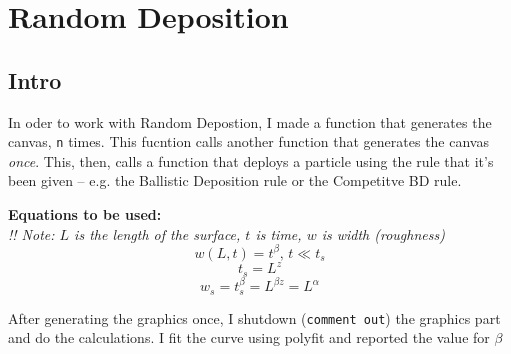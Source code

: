 \documentclass[12pt]{article}
\begin{document}
	\section{Random Deposition}
	\subsection{Intro}
	In oder to work with Random Depostion, I made a function that generates the canvas,
	\texttt{n} times. This fucntion calls another function that generates the canvas
	\emph{once}. This, then, calls a function that deploys a particle using the rule that it's been
	given -- e.g. the Ballistic Deposition rule or the Competitve BD rule.
	
	\textbf{Equations to be used:}\\
	\emph{!! Note: $L$ is the length of the surface, $t$ is time, $w$ is width (roughness)}
	\begin{equation}
		w(L, t) = t^{\beta}, \, t \ll t_s
		\label{eq:beta}
	\end{equation}
	\begin{equation}
		t_s = L^z
		\label{eq:z}
	\end{equation}
	\begin{equation}
		w_s = t_s^\beta = L^{\beta z} = L^\alpha
		\label{eq:alpha}
	\end{equation}
	
	After generating the graphics once, I shutdown (\texttt{comment out}) the graphics part and do the calculations. I fit the curve using polyfit and reported the value for $\beta$
\end{document}
